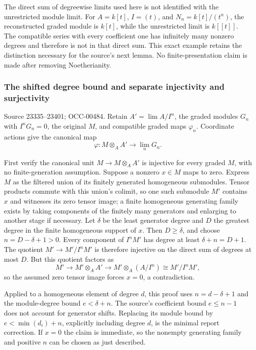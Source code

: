 The direct sum of degreewise limits used here is not identified with the unrestricted module limit. For \(A=k[t]\), \(I=(t)\), and \(N_n=k[t]/(t^n)\), the reconstructed graded module is \(k[t]\), while the unrestricted limit is \(k[[t]]\). The compatible series with every coefficient one has infinitely many nonzero degrees and therefore is not in that direct sum. This exact example retains the distinction necessary for the source's next lemma. No finite-presentation claim is made after removing Noetherianity.

\subsubsection{The shifted degree bound and separate injectivity and surjectivity}\label{the-shifted-degree-bound-and-separate-injectivity-and-surjectivity}

Source 23335--23401; OCC-00484. Retain \(A'=\lim A/I^n\), the graded modules \(G_n\) with \(I^nG_n=0\), the original \(M\), and compatible graded maps \(\varphi_n\). Coordinate actions give the canonical map \[
\varphi:M\otimes_A A'\longrightarrow\lim_nG_n.
\]

First verify the canonical unit \(M\to M\otimes_AA'\) is injective for every graded \(M\), with no finite-generation assumption. Suppose a nonzero \(x\in M\) maps to zero. Express \(M\) as the filtered union of its finitely generated homogeneous submodules. Tensor products commute with this union's colimit, so one such submodule \(M'\) contains \(x\) and witnesses its zero tensor image; a finite homogeneous generating family exists by taking components of the finitely many generators and enlarging to another stage if necessary. Let \(\delta\) be the least generator degree and \(D\) the greatest degree in the finite homogeneous support of \(x\). Then \(D\geq\delta\), and choose \(n=D-\delta+1>0\). Every component of \(I^nM'\) has degree at least \(\delta+n=D+1\). The quotient \(M'\to M'/I^nM'\) is therefore injective on the direct sum of degrees at most \(D\). But this quotient factors as \[
M'\longrightarrow M'\otimes_AA'
 \longrightarrow M'\otimes_A(A/I^n)
 \cong M'/I^nM',
\] so the assumed zero tensor image forces \(x=0\), a contradiction.

Applied to a homogeneous element of degree \(d\), this proof uses \(n=d-\delta+1\) and the module-degree bound \(e<\delta+n\). The source's coefficient bound \(e\leq n-1\) does not account for generator shifts. Replacing its module bound by \(e<\min(d_i)+n\), explicitly including degree \(d\), is the minimal report correction. If \(x=0\) the claim is immediate, so the nonempty generating family and positive \(n\) can be chosen as just described.

